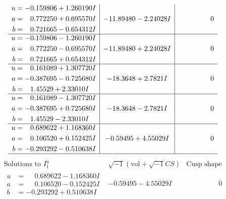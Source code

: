 \documentclass[1p]{elsarticle_modified}
\theoremstyle{definition}
\newcommand{\I}{\sqrt{-1}}
\begin{document}
$$\begin{array}{c|c|c}
\begin{aligned}
u &= -0.159806 + 1.260190 I \\
a &= \phantom{-}0.772250 + 0.695570 I \\
b &= \phantom{-}0.721665 - 0.654312 I\end{aligned}
 & -11.89480 - 2.24028 I & \phantom{-0.000000 } 0 \\ \hline\begin{aligned}
u &= -0.159806 - 1.260190 I \\
a &= \phantom{-}0.772250 - 0.695570 I \\
b &= \phantom{-}0.721665 + 0.654312 I\end{aligned}
 & -11.89480 + 2.24028 I & \phantom{-0.000000 } 0 \\ \hline\begin{aligned}
u &= \phantom{-}0.161089 + 1.307720 I \\
a &= -0.387695 - 0.725680 I \\
b &= \phantom{-}1.45529 + 2.33010 I\end{aligned}
 & -18.3648 + 2.7821 I & \phantom{-0.000000 } 0 \\ \hline\begin{aligned}
u &= \phantom{-}0.161089 - 1.307720 I \\
a &= -0.387695 + 0.725680 I \\
b &= \phantom{-}1.45529 - 2.33010 I\end{aligned}
 & -18.3648 - 2.7821 I & \phantom{-0.000000 } 0 \\ \hline\begin{aligned}
u &= \phantom{-}0.689622 + 1.168360 I \\
a &= \phantom{-}0.106520 + 0.152425 I \\
b &= -0.293292 - 0.510638 I\end{aligned}
 & -0.59495 + 4.55029 I & \phantom{-0.000000 } 0\\
 \hline 
 \end{array}$$\newpage$$\begin{array}{c|c|c}  
\text{Solutions to }I^u_{1}& \I (\text{vol} + \sqrt{-1}CS) & \text{Cusp shape}\\
 \hline 
\begin{aligned}
u &= \phantom{-}0.689622 - 1.168360 I \\
a &= \phantom{-}0.106520 - 0.152425 I \\
b &= -0.293292 + 0.510638 I\end{aligned}
 & -0.59495 - 4.55029 I & \phantom{-0.000000 } 0 \\ \hline\begin{aligned}

\end{aligned}
\end{array}$$
\end{document}
